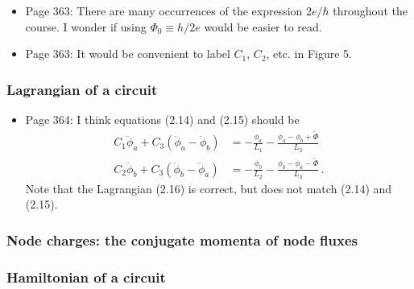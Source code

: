 \documentclass{article}
\begin{document}
\begin{itemize}

\item Page 363: There are many occurrences of the expression $2e / \hbar$ throughout the course. I wonder if using $\Phi_0 \equiv h / 2e$ would be easier to read.

\item Page 363: It would be convenient to label $C_1$, $C_2$, etc. in Figure 5.

\end{itemize}

\subsubsection{Lagrangian of a circuit}

\begin{itemize}

\item Page 364: I think equations (2.14) and (2.15) should be
\begin{align}
C_1 \ddot{\phi}_a + C_3 ( \ddot{\phi}_a - \ddot{\phi}_b) &= - \frac{\phi_a}{L_1} - \frac{\phi_a - \phi_b + \tilde{\Phi}}{L_3} \nonumber \\
C_2 \ddot{\phi}_b + C_3 ( \ddot{\phi}_b - \ddot{\phi}_a) &= - \frac{\phi_b}{L_2} - \frac{\phi_b - \phi_a - \tilde{\Phi}}{L_3} \nonumber \, .
\end{align}
Note that the Lagrangian (2.16) is correct, but does not match (2.14) and (2.15).

\end{itemize}

\subsubsection{Node charges: the conjugate momenta of node fluxes}

\subsubsection{Hamiltonian of a circuit}
\end{document}
